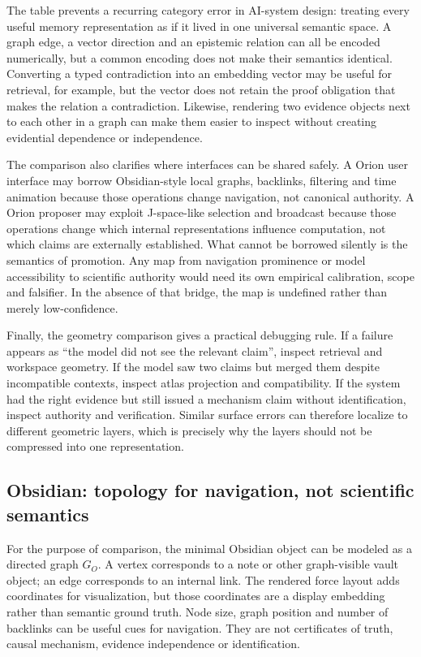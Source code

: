 The table prevents a recurring category error in AI-system design: treating every useful memory representation as if it lived in one universal semantic space. A graph edge, a vector direction and an epistemic relation can all be encoded numerically, but a common encoding does not make their semantics identical. Converting a typed contradiction into an embedding vector may be useful for retrieval, for example, but the vector does not retain the proof obligation that makes the relation a contradiction. Likewise, rendering two evidence objects next to each other in a graph can make them easier to inspect without creating evidential dependence or independence.

The comparison also clarifies where interfaces can be shared safely. A Orion user interface may borrow Obsidian-style local graphs, backlinks, filtering and time animation because those operations change navigation, not canonical authority. A Orion proposer may exploit J-space-like selection and broadcast because those operations change which internal representations influence computation, not which claims are externally established. What cannot be borrowed silently is the semantics of promotion. Any map from navigation prominence or model accessibility to scientific authority would need its own empirical calibration, scope and falsifier. In the absence of that bridge, the map is undefined rather than merely low-confidence.

Finally, the geometry comparison gives a practical debugging rule. If a failure appears as ``the model did not see the relevant claim'', inspect retrieval and workspace geometry. If the model saw two claims but merged them despite incompatible contexts, inspect atlas projection and compatibility. If the system had the right evidence but still issued a mechanism claim without identification, inspect authority and verification. Similar surface errors can therefore localize to different geometric layers, which is precisely why the layers should not be compressed into one representation.

\subsection{Obsidian: topology for navigation, not scientific semantics}

For the purpose of comparison, the minimal Obsidian object can be modeled as a directed graph \(G_O\). A vertex corresponds to a note or other graph-visible vault object; an edge corresponds to an internal link. The rendered force layout adds coordinates for visualization, but those coordinates are a display embedding rather than semantic ground truth. Node size, graph position and number of backlinks can be useful cues for navigation. They are not certificates of truth, causal mechanism, evidence independence or identification.

